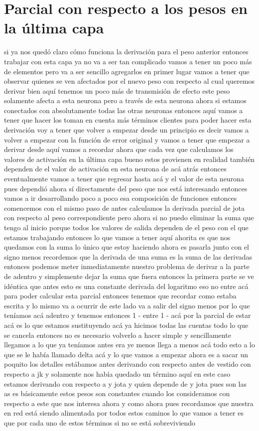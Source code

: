 \section{Parcial con respecto a los pesos en la última capa}

si ya nos quedó claro cómo funciona la derivación para el peso anterior entonces trabajar con esta capa ya no va a ser tan complicado vamos a tener un poco más de elementos pero va a ser sencillo agregarlos en primer lugar vamos a tener que observar quienes se ven afectados por el nuevo peso con respecto al cual queremos derivar bien aquí tenemos un poco más de transmisión de efecto este peso solamente afecta a esta neurona pero a través de esta neurona ahora si estamos conectados con absolutamente todas las otras neuronas entonces aquí vamos a tener que hacer los toman en cuenta más términos clientes para poder hacer esta derivación voy a tener que volver a empezar desde un principio es decir vamos a volver a empezar con la función de error original y vamos a tener que empezar a derivar desde aquí vamos a recordar ahora que cada vez que calculamos los valores de activación en la última capa bueno estos provienen en realidad también dependen de el valor de activación en esta neurona de acá atrás entonces eventualmente vamos a tener que regresar hasta acá y el valor de esta neurona pues dependió ahora sí directamente del peso que nos está interesando entonces vamos a ir desarrollando poco a poco esa composición de funciones entonces comencemos con el mismo paso de antes calculamos la derivada parcial de jota con respecto al peso correspondiente pero ahora si no puedo eliminar la suma que tengo al inicio porque todos los valores de salida dependen de el peso con el que estamos trabajando entonces lo que vamos a tener aquí ahorita es que nos quedamos con la suma lo único que estoy haciendo ahora es pasarla junto con el signo menos recordemos que la derivada de una suma es la suma de las derivadas entonces podemos meter inmediatamente nuestro problema de derivar a la parte de adentro y simplemente dejar la suma que fuera entonces la primera parte se ve idéntica que antes esto es una constante derivada del logaritmo eso no entre acá para poder calcular esta parcial entonces tenemos que recordar como estaba escrita y lo mismo va a ocurrir de este lado va a salir del signo menos por lo que teníamos acá adentro y tenemos entonces 1 - entre 1 - acá por la parcial de estar acá es lo que estamos sustituyendo acá ya hicimos todas las cuentas todo lo que se cancela entonces no es necesario volverlo a hacer simple y sencillamente llegamos a lo que ya teníamos antes era ye menos llega a menos acá todo esto a lo que se le había llamado delta acá y lo que vamos a empezar ahora es a sacar un poquito los detalles estábamos antes derivando con respecto antes de vestido con respecto a jk y solamente nos había quedado un término aquí en este caso estamos derivando con respecto a y jota y quien depende de y jota pues son las as es básicamente estos pesos son constantes cuando los consideramos con respecto a este que nos interesa ahora y como ahora pues recordamos que nuestra en red está siendo alimentada por todos estos caminos lo que vamos a tener es que por cada uno de estos términos si no se está sobreviviendo 